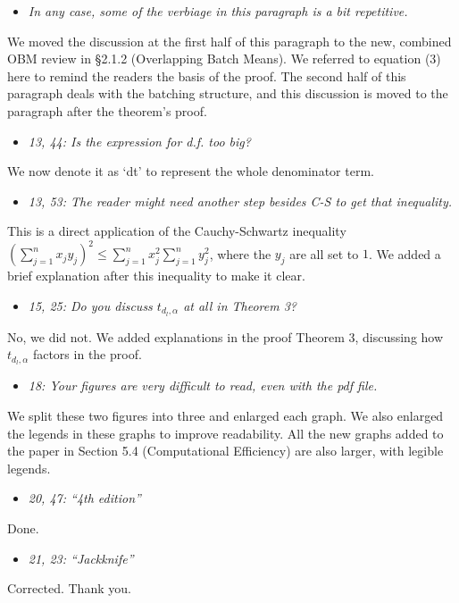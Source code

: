 \documentclass[11pt,notitlepage,onecolumn]{article}
\newcommand{\noi}{\noindent}
\begin{document}
\begin{itemize}
\item[] \textit{In any case, some of the verbiage in this paragraph is a bit repetitive.}
\end{itemize}

\noi
We moved the discussion at the first half of this paragraph to the new, combined OBM review in \S 2.1.2 (Overlapping Batch Means). 
We referred to equation (3) here to remind the readers the basis of the proof.
The second half of this paragraph deals with the batching structure, and this discussion is moved to the paragraph after the theorem's proof. 
\medskip 



\begin{itemize}
\item[] \textit{13, 44: Is the expression for d.f. too big?}
\end{itemize}

\noi
We now denote it as `dt' to represent the whole denominator term. 
\medskip 



\begin{itemize}
\item[] \textit{13, 53: The reader might need another step besides C-S to get that inequality.}
\end{itemize}

\noi
This is a direct application of the Cauchy-Schwartz inequality $\left(\sum_{j=1}^{n}x_j y_j\right)^2 \leq \sum_{j=1}^{n}x_j^2 \sum_{j=1}^{n}y_j^2$, where the $y_j$ are all set to $1$. 
We added a brief explanation after this inequality to make it clear. 
\medskip 



\begin{itemize}
\item[] \textit{15, 25: Do you discuss $t_{d_l,\alpha}$ at all in Theorem 3?}
\end{itemize}

\noi
No, we did not.   
We added explanations in the proof Theorem 3, discussing how $t_{d_l,\alpha}$ factors in the proof. 
\medskip 



\begin{itemize}
\item[] \textit{18: Your figures are very difficult to read, even with the pdf file.}
\end{itemize}

\noi
We split these two figures into three and enlarged each graph. 
We also enlarged the legends in these graphs to improve readability.
All the new graphs added to the paper in Section 5.4 (Computational Efficiency) are also larger, with legible legends. 
\medskip 



\begin{itemize}
\item[] \textit{20, 47: ``4th edition''}
\end{itemize}

\noi
Done.
\medskip 



\begin{itemize}
\item[] \textit{21, 23: ``\it Jackknife''}
\end{itemize}

\noi
Corrected. Thank you. 
\end{document}
